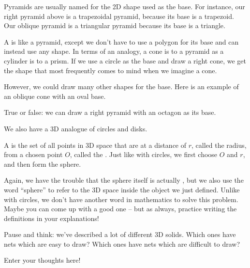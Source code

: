 \documentclass{ximera}
\begin{document}
Pyramids are usually named for the 2D shape used as the base. For instance, our right pyramid above is a trapezoidal pyramid, because its base is a trapezoid. Our oblique pyramid is a triangular pyramid because its base is a triangle.

A  is like a pyramid, except we don't have to use a polygon for its base and can instead use any shape. In terms of an analogy, a cone is to a pyramid as a cylinder is to a prism. If we use a circle as the base and draw a right cone, we get the shape that most frequently comes to mind when we imagine a cone.
\begin{center}

\end{center}
However, we could draw many other shapes for the base. Here is an example of an oblique cone with an oval base.
\begin{center}
\end{center}

\begin{question}
True or false: we can draw a right pyramid with an octagon as its base.
\begin{multipleChoice}
\end{multipleChoice}
\end{question}


We also have a 3D analogue of circles and disks. 
\begin{definition}
	A  is the set of all points in 3D space that are at a distance of $r$, called the radius, from a chosen point $O$, called the . Just like with circles, we first choose $O$ and $r$, and then form the sphere.
\end{definition}
Again, we have the trouble that the sphere itself is actually , but we also use the word ``sphere'' to refer to the 3D space inside the object we just defined. Unlike with circles, we don't have another word in mathematics to solve this problem. Maybe you can come up with a good one -- but as always, practice writing the definitions in your explanations!




\begin{question}
Pause and think: we've described a lot of different 3D solids. Which ones have nets which are easy to draw? Which ones have nets which are difficult to draw?
\begin{freeResponse}
Enter your thoughts here!
\end{freeResponse}
\end{question}
\end{document}
